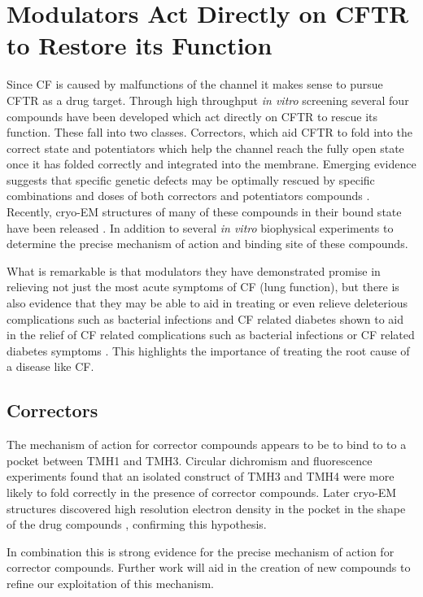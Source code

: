 \section{Modulators Act Directly on CFTR to Restore its Function}
Since CF is caused by malfunctions of the channel it makes sense to pursue CFTR as a drug target. Through high throughput \textit{in vitro} screening several four compounds have been developed which act directly on CFTR to rescue its function. These fall into two classes. Correctors, which aid CFTR to fold into the correct state and potentiators which help the channel reach the fully open state once it has folded correctly and integrated into the membrane. Emerging evidence suggests that specific genetic defects may be optimally rescued by specific combinations and doses of both correctors and potentiators compounds \cite{}. Recently, cryo-EM structures of many of these compounds in their bound state have been released \cite{liu2019, fiedorczuk2022}. In addition to several \textit {in vitro} biophysical experiments to determine the precise mechanism of action and binding site of these compounds.

What is remarkable is that modulators they have demonstrated promise in relieving not just the most acute symptoms of CF (lung function), but there is also evidence that they may be able to aid in treating or even relieve deleterious complications such as bacterial infections and CF related diabetes  shown to aid in the relief of CF related complications such as bacterial infections or CF related diabetes symptoms \cite{gaines2021,lopes-pacheco2020, yi2021}. This highlights the importance of treating the root cause of a disease like CF.

\subsection{Correctors}
The mechanism of action for corrector compounds appears to be to bind to to a pocket between TMH1 and TMH3. Circular dichromism \cite{greenfield2006} and fluorescence experiments found that an isolated construct of TMH3 and TMH4 were more likely to fold correctly in the presence of corrector compounds. Later cryo-EM structures discovered high resolution electron density in the pocket in the shape of the drug compounds \cite{fiedorczuk2022}, confirming this hypothesis. 

In combination this is strong evidence for the precise mechanism of action for corrector compounds. Further work will aid in the creation of new compounds to refine our exploitation of this mechanism.

